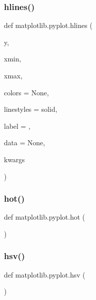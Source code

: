 \mbox{\label{namespacematplotlib_1_1pyplot_a907349be40e3da802bd57964572d2c8a}} 
\subsubsection{\texorpdfstring{hlines()}{hlines()}}
{\footnotesize\ttfamily def matplotlib.\+pyplot.\+hlines (\begin{DoxyParamCaption}\item[{}]{y,  }\item[{}]{xmin,  }\item[{}]{xmax,  }\item[{}]{colors = {\ttfamily None},  }\item[{}]{linestyles = {\ttfamily \textquotesingle{}solid\textquotesingle{}},  }\item[{}]{label = {\ttfamily \textquotesingle{}\textquotesingle{}},  }\item[{}]{data = {\ttfamily None},  }\item[{}]{kwargs }\end{DoxyParamCaption})}

\mbox{\label{namespacematplotlib_1_1pyplot_a3b87ca8cee58115c55da6a803af28158}} 
\subsubsection{\texorpdfstring{hot()}{hot()}}
{\footnotesize\ttfamily def matplotlib.\+pyplot.\+hot (\begin{DoxyParamCaption}{ }\end{DoxyParamCaption})}

\mbox{\label{namespacematplotlib_1_1pyplot_ab085eb91106f59b23b32cd9c83cfd615}} 
\subsubsection{\texorpdfstring{hsv()}{hsv()}}
{\footnotesize\ttfamily def matplotlib.\+pyplot.\+hsv (\begin{DoxyParamCaption}{ }\end{DoxyParamCaption})}

